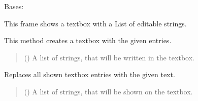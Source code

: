 \documentclass[letterpaper,10pt,english]{sphinxmanual}
\begin{document}
\begin{fulllineitems}
\label{\detokenize{apidoc/src.osm_configurator.view.utilityframes:src.osm_configurator.view.utilityframes.tag_list_frame.TagListFrame}}
\pysigstartsignatures
{}
\pysigstopsignatures
\sphinxAtStartPar
Bases: 

\sphinxAtStartPar
This frame shows a textbox with a List of editable strings.

\begin{fulllineitems}
\label{\detokenize{apidoc/src.osm_configurator.view.utilityframes:src.osm_configurator.view.utilityframes.tag_list_frame.TagListFrame.__init__}}
\pysigstartsignatures
{}
\pysigstopsignatures
\sphinxAtStartPar
This method creates a textbox with the given entries.
\begin{quote}\begin{description}
\sphinxAtStartPar
{}\sphinxstyleliteralstrong{\sphinxupquote{{[}}}\sphinxstyleliteralstrong{\sphinxupquote{{]}}} () \textendash{} A list of strings, that will be written in the textbox.

\end{description}\end{quote}

\end{fulllineitems}


\begin{fulllineitems}
\label{\detokenize{apidoc/src.osm_configurator.view.utilityframes:src.osm_configurator.view.utilityframes.tag_list_frame.TagListFrame.set_text_list}}
\pysigstartsignatures
{}
\pysigstopsignatures
\sphinxAtStartPar
Replaces all shown textbox entries with the given text.
\begin{quote}\begin{description}
\sphinxAtStartPar
{}\sphinxstyleliteralstrong{\sphinxupquote{{[}}}\sphinxstyleliteralstrong{\sphinxupquote{{]}}} () \textendash{} A list of strings, that will be shown on the textbox.


\end{description}
\end{quote}
\end{fulllineitems}
\end{fulllineitems}
\end{document}
